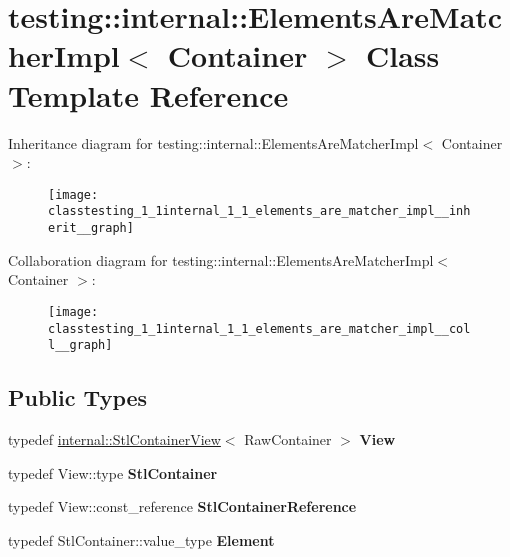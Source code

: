 \hypertarget{classtesting_1_1internal_1_1_elements_are_matcher_impl}{}\section{testing\+:\+:internal\+:\+:Elements\+Are\+Matcher\+Impl$<$ Container $>$ Class Template Reference}
\label{classtesting_1_1internal_1_1_elements_are_matcher_impl}


Inheritance diagram for testing\+:\+:internal\+:\+:Elements\+Are\+Matcher\+Impl$<$ Container $>$\+:
\nopagebreak
\begin{figure}[H]
\begin{center}
\leavevmode
\texttt{[image: classtesting\_1\_1internal\_1\_1\_elements\_are\_matcher\_impl\_\_inherit\_\_graph]}
\end{center}
\end{figure}


Collaboration diagram for testing\+:\+:internal\+:\+:Elements\+Are\+Matcher\+Impl$<$ Container $>$\+:
\nopagebreak
\begin{figure}[H]
\begin{center}
\leavevmode
\texttt{[image: classtesting\_1\_1internal\_1\_1\_elements\_are\_matcher\_impl\_\_coll\_\_graph]}
\end{center}
\end{figure}
\subsection*{Public Types}
\begin{DoxyCompactItemize}
\item 
\mbox{\label{classtesting_1_1internal_1_1_elements_are_matcher_impl_a68c37c6cc56c047323543044445a5022}} 
typedef \mbox{\hyperlink{classtesting_1_1internal_1_1_stl_container_view}{internal\+::\+Stl\+Container\+View}}$<$ Raw\+Container $>$ {\bfseries View}
\item 
\mbox{\label{classtesting_1_1internal_1_1_elements_are_matcher_impl_a5897abb9a1dcf88afe04e14986ebe46f}} 
typedef View\+::type {\bfseries Stl\+Container}
\item 
\mbox{\label{classtesting_1_1internal_1_1_elements_are_matcher_impl_ad5d20c1aa6e8c06c82fe3ac4d68c2278}} 
typedef View\+::const\+\_\+reference {\bfseries Stl\+Container\+Reference}
\item 
\mbox{\label{classtesting_1_1internal_1_1_elements_are_matcher_impl_ab2ae88256ac950b69cd2af67b9820c87}} 
typedef Stl\+Container\+::value\+\_\+type {\bfseries Element}
\end{DoxyCompactItemize}
